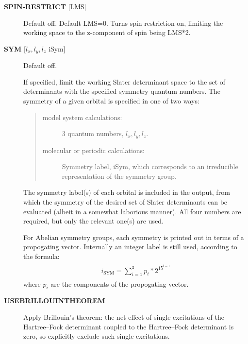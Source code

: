 \documentclass[openany,a4paper,10pt]{manual}
\begin{document}
\begin{description}
\item[\textbf{SPIN-RESTRICT} {[}LMS{]}]
Default off.  Default LMS=0.  Turns spin restriction on, limiting
the working space to the z-component of spin being LMS*2.

\item[\textbf{SYM} {[}$l_x,l_y,l_z$ iSym{]}]
Default off.

If specified, limit the working Slater determinant space to the set
of determinants with the specified symmetry quantum numbers. The symmetry
of a given orbital is specified in one of two ways:
\begin{quote}
\begin{description}
\item[model system calculations:]
3 quantum numbers, $l_x,l_y,l_z$.

\item[molecular or periodic calculations:]
Symmetry label, iSym, which corresponds to an irreducible
representation of the symmetry group.

\end{description}
\end{quote}

The symmetry label(s) of each orbital is included in the output,
from which the symmetry of the desired set of Slater determinants
can be evaluated (albeit in a somewhat laborious manner). All four
numbers are required, but only the relevant one(s) are used.

For Abelian symmetry groups, each symmetry is printed out in terms of
a propogating vector.  Internally an integer label is still used, according to
the formula:
\begin{align}\begin{split}i_{\textrm{SYM}} = \sum_{i=1}^3 p_i * 2^{15^{i-1}}\end{split}\end{align}
where $p_i$ are the components of the propogating vector.

\item[\textbf{USEBRILLOUINTHEOREM}]
Apply Brillouin's theorem: the net effect of single-excitations of
the Hartree--Fock determinant coupled to the Hartree--Fock determinant
is zero, so explicitly exclude such single excitations.

\end{description}
\end{document}
